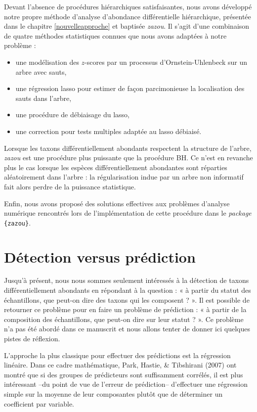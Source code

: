 \documentclass[12pt,a4paper]{reedthesis}
\theoremstyle{definition}
\theoremstyle{definition}
\theoremstyle{definition}
\theoremstyle{remark}
\begin{document}
Devant l'absence de procédures hiérarchiques satisfaisantes, nous avons développé notre propre méthode d'analyse d'abondance différentielle hiérarchique, présentée dans le chapitre \ref{nouvelleapproche} et baptisée \emph{zazou}. Il s'agit d'une combinaison de quatre méthodes statistiques connues que nous avons adaptées à notre problème :
\begin{itemize}
\item
  une modélisation des \(z\)-scores par un processus d'Ornstein-Uhlenbeck sur un arbre avec sauts,
\item
  une régression lasso pour estimer de façon parcimonieuse la localisation des sauts dans l'arbre,
\item
  une procédure de débiaisage du lasso,
\item
  une correction pour tests multiples adaptée au lasso débiaisé.
\end{itemize}
Lorsque les taxons différentiellement abondants respectent la structure de l'arbre, \emph{zazou} est une procédure plus puissante que la procédure BH. Ce n'est en revanche plus le cas lorsque les espèces différentiellement abondantes sont réparties aléatoirement dans l'arbre : la régularisation indue par un arbre non informatif fait alors perdre de la puissance statistique.

Enfin, nous avons proposé des solutions effectives aux problèmes d'analyse numérique rencontrés lors de l'implémentation de cette procédure dans le \emph{package} \texttt{\{zazou\}}.

\hypertarget{duxe9tection-versus-pruxe9diction}{%
\section*{Détection versus prédiction}\label{duxe9tection-versus-pruxe9diction}}

Jusqu'à présent, nous nous sommes seulement intéressés à la détection de taxons différentiellement abondants en répondant à la question : « à partir du statut des échantillons, que peut-on dire des taxons qui les composent ? ». Il est possible de retourner ce problème pour en faire un problème de prédiction : « à partir de la composition des échantillons, que peut-on dire sur leur statut ? ». Ce problème n'a pas été abordé dans ce manuscrit et nous allons tenter de donner ici quelques pistes de réflexion.

L'approche la plus classique pour effectuer des prédictions est la régression linéaire. Dans ce cadre mathématique, Park, Hastie, \& Tibshirani (2007) ont montré que si des groupes de prédicteurs sont suffisamment corrélés, il est plus intéressant --du point de vue de l'erreur de prédiction-- d'effectuer une régression simple sur la moyenne de leur composantes plutôt que de déterminer un coefficient par variable.
\end{document}
